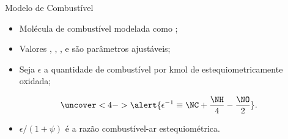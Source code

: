     \begin{frame}{Modelo de Combustível}\vspace*{-2em}
        \begin{itemize}
            \item<1-> Molécula de combustível \alert{modelada} como \alert{}; \\[\bigskipamount]
            \item<2-> Valores \alert{\NC}, \alert{\NH}, \alert{\NO}, e \alert{\NN} são
                \alert{parâmetros} ajustáveis; \\[\bigskipamount]
            \item<3-> Seja \alert{$\epsilon$} a quantidade de \alert{combustível por kmol de
                } estequiometricamente oxidada; \\[\bigskipamount]
        \end{itemize}
        \vspace*{0.8em}\begin{equation*}
            \uncover<4->{
                \alert{\epsilon^{-1} \equiv \NC + \frac{\NH}{4} - \frac{\NO}{2}}.
            }
        \end{equation*}
        \vspace*{-0.8em}\begin{itemize}
            \item<5-> \alert{$\epsilon/(1+\psi)$} é a razão \alert{combustível-ar}
                estequiométrica.
        \end{itemize}
    \end{frame}

